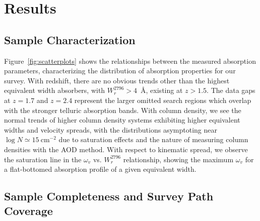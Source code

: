 \documentclass[iop,apj,numberedappendix,appendixfloats,twocolappendix]{emulateapj}
\begin{document}
\section{Results}
\label{sec:results}

\subsection{Sample Characterization}
\label{sec:sample}

\begin{figure*}[bth]
\caption{Correlations between measured absorption properties for the Vulture survey. $\log N$ is the ${\MgII}$ AOD column density, $\omega_v$ is the kinematic spread, $W_r^{2796}$ is the rest frame {} equivalent width, and $z$ is the absorption redshift.}
\label{fig:scatterplots}
\end{figure*}

Figure~\ref{fig:scatterplots} shows the relationships between the measured absorption parameters, characterizing the distribution of absorption properties for our survey. With redshift, there are no obvious trends other than the highest equivalent width absorbers, with $W_r^{2796} > 4$~{\AA}, existing at $z > 1.5$. The data gaps at $z = 1.7$ and $z = 2.4$ represent the larger omitted search regions which overlap with the stronger telluric absorption bands. With column density, we see the normal trends of higher column density systems exhibiting higher equivalent widths and velocity spreads, with the distributions asymptoting near $\log N \simeq 15~\mathrm{cm^{-2}}$ due to saturation effects and the nature of measuring column densities with the AOD method. With respect to kinematic spread, we observe the saturation line in the $\omega_v$ vs. $W_r^{2796}$ relationship, showing the maximum $\omega_v$ for a flat-bottomed absorption profile of a given equivalent width.

\subsection{Sample Completeness and Survey Path Coverage}

\begin{figure*}[bth]
\caption{The function $g(W_r^{\lambda2796}, z)$ shown as a heat map with the colors representing the value of $g(W_r^{2796}, z)$. This is the number of spectra in which an absorption line of a given equivalent width and a given redshift may be detected according to the detection limit of the spectrum. The vertical black bars representing no redshift path length coverage show the omitted wavelength regions of the survey based upon contaminating telluric absorption features.}
\label{fig:gwz}
\end{figure*}
\end{document}

